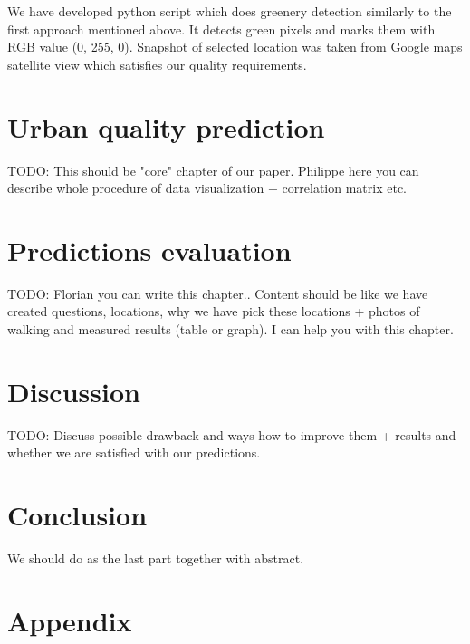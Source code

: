 \documentclass[letterpaper]{article}
\begin{document}
\indent We have developed python script which does greenery detection similarly to the first approach mentioned above. It detects green pixels and marks them with RGB value (0, 255, 0). Snapshot of selected location was taken from Google maps satellite view which satisfies our quality requirements.  %
 
\section{Urban quality prediction}
TODO: This should be "core" chapter of our paper. Philippe here you can describe whole procedure of data visualization + correlation matrix etc.

\section{Predictions evaluation}\label{sec:exp}
TODO: Florian you can write this chapter.. Content should be like we have created questions, locations, why we have pick these locations + photos 
of walking and measured results (table or graph). I can help you with this chapter.

\section{Discussion}\label{sec:discussion}
TODO: Discuss possible drawback and ways how to improve them + results and whether we are satisfied with our predictions.

\section{Conclusion}\label{sec:conclusion}
We should do as the last part together with abstract.





\newpage
\section{Appendix}
\end{document}
